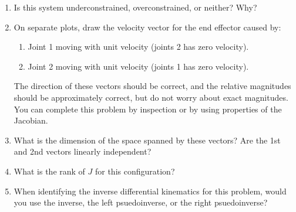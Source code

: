 \documentclass{16384_doc} %
\begin{document}
\begin{questions}
\begin{enumerate} [label=\alph*.]
        \item \text{[1 point]} Is this system underconstrained, overconstrained, or neither?
        Why?
        \begin{tcolorbox}[height=3cm]
        \end{tcolorbox}
        
        \item \text{[4 points]} On separate plots, draw the velocity vector for the end effector
        caused by:
        \begin{enumerate} [label=(\roman*)]
          \item Joint 1 moving with unit velocity (joints 2 has zero velocity).
          \item Joint 2 moving with unit velocity (joints 1 has zero velocity).
        \end{enumerate}
        The direction of these vectors should be correct, and the relative
        magnitudes should be approximately correct, but do not worry about
        exact magnitudes.  You can complete this problem by inspection or by
        using properties of the Jacobian.
        \begin{tcolorbox}[height=3cm]
        \end{tcolorbox}
        
        \item \text{[2 points]} What is the dimension of the space spanned by these vectors?
        Are the 1st and 2nd vectors linearly independent?
        \begin{tcolorbox}[height=3cm]
        \end{tcolorbox}
        
        \item \text{[1 point]} What is the rank of $J$ for this configuration?
        \begin{tcolorbox}[height=3cm]
        \end{tcolorbox}
        
        \item \text{[1 point]} When identifying the inverse differential kinematics for this
        problem, would you use the inverse, the left psuedoinverse, or the right
        psuedoinverse?
        \begin{tcolorbox}[height=3cm]
        \end{tcolorbox}
        

\end{enumerate}
\end{questions}
\end{document}
